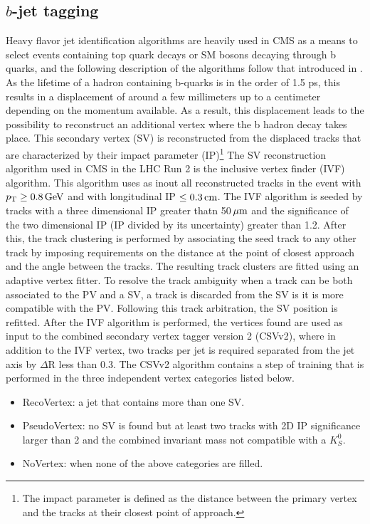 \subsection{$b$-jet tagging}\label{sec:objectsBJets}
Heavy flavor jet identification algorithms are heavily used in CMS as a means to select events containing top quark decays or SM bosons decaying through b quarks, and the following description of the algorithms follow that introduced in \cite{Sirunyan:2017ezt}. 
As the lifetime of a hadron containing b-quarks is in the order of 1.5 ps, this results in a displacement of around a few millimeters up to a centimeter depending on the momentum available. 
As a result, this displacement leads to the possibility to reconstruct an additional vertex where the b hadron decay takes place. 
This secondary vertex (SV) is reconstructed from the displaced tracks that are characterized by their impact parameter (IP)\footnote{The impact parameter is defined as the distance between the primary vertex and the tracks at their closest point of approach.}
The SV reconstruction algorithm used in CMS in the LHC Run 2 is the inclusive vertex finder (IVF) algorithm.
This algorithm uses as inout all reconstructed tracks in the event with $p_{\mathrm{T}}\geq0.8\,\text{Ge\hspace{-.08em}V}$ and with longitudinal IP $\leq0.3\,\text{cm}$. 
The IVF algorithm is seeded by tracks with a three dimensional IP greater thatn 50$\,\mu\text{m}$ and the significance of the two dimensional IP (IP divided by its uncertainty) greater than 1.2. 
After this, the track clustering is performed by associating the seed track to any other track by imposing requirements on the distance at the point of closest approach and the angle between the tracks. 
The resulting track clusters are fitted using an adaptive vertex fitter. 
To resolve the track ambiguity when a track can be both associated to the PV and a SV, a track is discarded from the SV is it is more compatible with the PV. 
Following this track arbitration, the SV position is refitted. 
After the IVF algorithm is performed, the vertices found are used as input to the combined secondary vertex tagger version 2 (CSVv2), where in addition to the IVF vertex, two tracks per jet is required separated from the jet axis by $\Delta$R less than 0.3. 
The CSVv2 algorithm contains a step of training that is performed in the three independent vertex categories listed below.
\begin{itemize}
\item RecoVertex: a jet that contains more than one SV.
\item PseudoVertex: no SV is found but at least two tracks with 2D IP significance larger than 2 and the combined invariant mass not compatible with a $K_{S}^{0}$. 
\item NoVertex: when none of the above categories are filled. 
\end{itemize}
